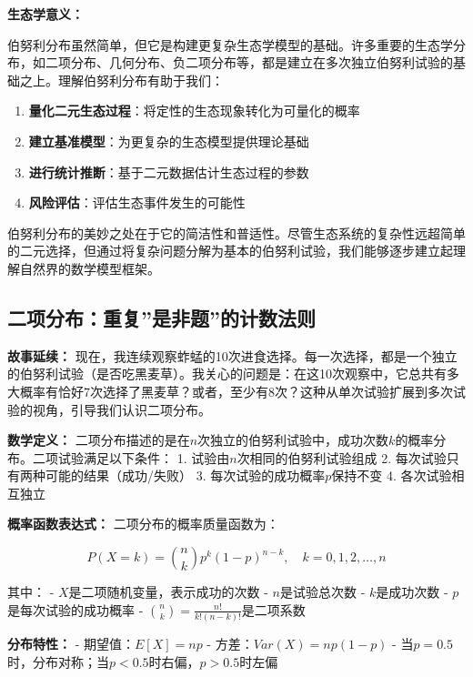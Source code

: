 \documentclass[
  twoside]{book}
\providecommand{\tightlist}{%
  \setlength{\itemsep}{0pt}\setlength{\parskip}{0pt}}
\begin{document}
\textbf{生态学意义：}

伯努利分布虽然简单，但它是构建更复杂生态学模型的基础。许多重要的生态学分布，如二项分布、几何分布、负二项分布等，都是建立在多次独立伯努利试验的基础之上。理解伯努利分布有助于我们：

\begin{enumerate}
\def\labelenumi{\arabic{enumi}.}
\tightlist
\item
  \textbf{量化二元生态过程}：将定性的生态现象转化为可量化的概率
\item
  \textbf{建立基准模型}：为更复杂的生态模型提供理论基础
\item
  \textbf{进行统计推断}：基于二元数据估计生态过程的参数
\item
  \textbf{风险评估}：评估生态事件发生的可能性
\end{enumerate}

伯努利分布的美妙之处在于它的简洁性和普适性。尽管生态系统的复杂性远超简单的二元选择，但通过将复杂问题分解为基本的伯努利试验，我们能够逐步建立起理解自然界的数学模型框架。

\hypertarget{ux4e8cux9879ux5206ux5e03ux91cdux590dux662fux975eux9898ux7684ux8ba1ux6570ux6cd5ux5219}{%
\subsection{二项分布：重复''是非题''的计数法则}\label{ux4e8cux9879ux5206ux5e03ux91cdux590dux662fux975eux9898ux7684ux8ba1ux6570ux6cd5ux5219}}

\textbf{故事延续：} 现在，我连续观察蚱蜢的10次进食选择。每一次选择，都是一个独立的伯努利试验（是否吃黑麦草）。我关心的问题是：在这10次观察中，它总共有多大概率有恰好7次选择了黑麦草？或者，至少有8次？这种从单次试验扩展到多次试验的视角，引导我们认识二项分布。

\textbf{数学定义：} 二项分布描述的是在\(n\)次独立的伯努利试验中，成功次数\(k\)的概率分布。二项试验满足以下条件：
1. 试验由\(n\)次相同的伯努利试验组成
2. 每次试验只有两种可能的结果（成功/失败）
3. 每次试验的成功概率\(p\)保持不变
4. 各次试验相互独立

\textbf{概率函数表达式：} 二项分布的概率质量函数为：

\[P(X = k) = \binom{n}{k} p^k (1-p)^{n-k}, \quad k = 0, 1, 2, \ldots, n\]

其中：
- \(X\)是二项随机变量，表示成功的次数
- \(n\)是试验总次数
- \(k\)是成功次数
- \(p\)是每次试验的成功概率
- \(\binom{n}{k} = \frac{n!}{k!(n-k)!}\)是二项系数

\textbf{分布特性：}
- 期望值：\(E[X] = np\)
- 方差：\(Var(X) = np(1-p)\)
- 当\(p=0.5\)时，分布对称；当\(p<0.5\)时右偏，\(p>0.5\)时左偏
\end{document}
